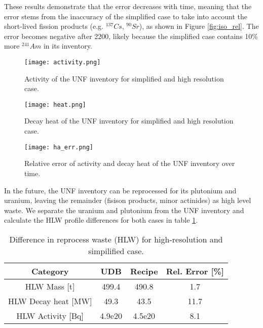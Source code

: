 \documentclass{anstrans}
\begin{document}
These results demonstrate that the error decreases with time, meaning that the error 
stems from the inaccuracy of the simplified case to take into account the short-lived 
fission products (e.g. $^{137}Cs$, $^{90}Sr$), as shown in Figure \ref{fig:iso_rel}. The
error becomes negative after 2200, likely because the simplified
case contains 10\% more $^{241}Am$ in its inventory.

\begin{figure}
    \centering
    \texttt{[image: activity.png]}
    \caption{Activity of the \gls{UNF} inventory for simplified and
            high resolution case.}
    \label{fig:act}
\end{figure}

\begin{figure}
    \centering
    \texttt{[image: heat.png]}
    \caption{Decay heat of the \gls{UNF} inventory for simplified
             and high resolution  case.}
    \label{fig:heat}
\end{figure}

\begin{figure}
    \centering
    \texttt{[image: ha\_err.png]}
    \caption{Relative error of activity and decay heat of the
            \gls{UNF} inventory over time.}
    \label{fig:wm_err}
\end{figure}

In the future, the \gls{UNF} inventory can be reprocessed
for its plutonium and uranium, leaving the remainder (fisison
products, minor actinides) as high level waste. We separate the 
uranium and plutonium from the \gls{UNF} inventory and calculate 
the \gls{HLW} profile differences for both cases in table
\ref{tab:hlw}.

\begin{table}[h]
    \centering
    \begin{tabular}{cccc}
        \hline
        Category & UDB & Recipe & Rel. Error [\%] \\
        \hline
        \gls{HLW} Mass [t]& 499.4 & 490.8 & 1.7\\
        \gls{HLW} Decay heat [MW] & 49.3 & 43.5 & 11.7 \\
        \gls{HLW} Activity [Bq] & 4.9e20 & 4.5e20 & 8.1\\
        \hline
    \end{tabular}
    \caption{Difference in reprocess waste (\gls{HLW}) for
            high-resolution and simpilified case.}
    \label{tab:hlw}
\end{table}
\end{document}
